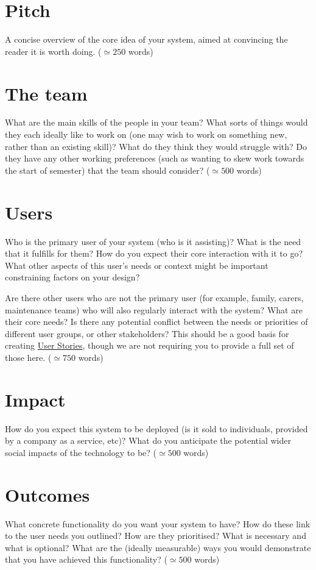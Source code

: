 \documentclass{article}
\begin{document}
\section{Pitch} 
A concise overview of the core idea of your system, aimed at convincing the reader it is worth doing. ($\simeq 250$  words)

\section{The team} 
What are the main skills of the people in your team? What sorts of things would they each ideally like to work on (one may wish to work on something new, rather than an existing skill)? What do they think they would struggle with? Do they have any other working preferences (such as wanting to skew work towards the start of semester) that the team should consider?  ($\simeq 500$  words)

\section{Users} 
Who is the primary user of your system (who is it assisting)? What is the need that it fulfills for them? How do you expect their core interaction with it to go? What other aspects of this user’s needs or context might be important constraining factors on your design?

Are there other users who are not the primary user (for example, family, carers, maintenance teams) who will also regularly interact with the system? What are their core needs? Is there any potential conflict between the needs or priorities of different user groups, or other stakeholders?
This should be a good basis for creating \href{https://www.atlassian.com/agile/project-management/user-stories}{User Stories}, though we are not requiring you to provide a full set of those here.
 ($\simeq 750$ words)

\section{Impact}
How do you expect this system to be deployed (is it sold to individuals, provided by a company as a service, etc)? What do you anticipate the potential wider social impacts of the technology to be?
 ($\simeq 500$ words)

\section{Outcomes}
What concrete functionality do you want your system to have? How do these link to the user needs you outlined? How are they prioritised? What is necessary and what is optional? What are the (ideally measurable) ways you would demonstrate that you have achieved this functionality?
 ($\simeq 500$ words)
\end{document}

